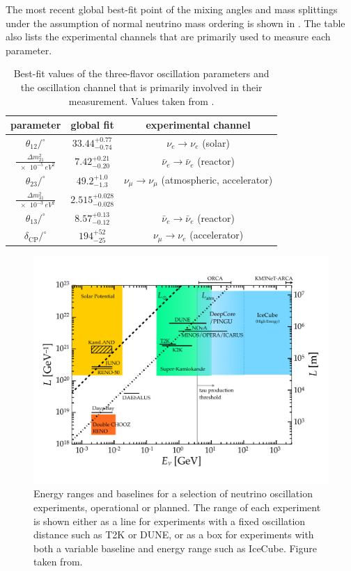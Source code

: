 The most recent global best-fit point\cite{Esteban:2020cvm} of the mixing angles and mass splittings under the assumption of normal neutrino mass ordering is shown in .
The table also lists the experimental channels that are primarily used to measure each parameter.
\begin{table}
\caption{Best-fit values of the three-flavor oscillation parameters and the oscillation channel that is primarily involved in their measurement. Values taken from \cite{Esteban:2020cvm}.\label{tab:global-bfp}}
\begin{tabular}{ccc}\toprule
    parameter & global fit & experimental channel \\ \midrule
    $\theta_{12}/^\circ$                    & $33.44^{+0.77}_{-0.74}$   & $\nu_e \rightarrow \nu_e$ (solar)\\
    $\frac{\Delta m^2_{21}}{\SI{e-5}{eV^2}}$& $7.42^{+0.21}_{-0.20}$    & $\bar{\nu}_e \rightarrow \bar{\nu}_e$ (reactor)\\
    $\theta_{23}/^\circ$                    & $49.2^{+1.0}_{-1.3} $     & $\nu_\mu \rightarrow \nu_\mu$  (atmospheric, accelerator)\\
    $\frac{\Delta m^2_{31}}{\SI{e-3}{eV^2}}$& $2.515^{+0.028}_{-0.028}$ & \\
    $\theta_{13}/^\circ$                    & $8.57^{+0.13}_{-0.12} $   & $\bar{\nu}_e \rightarrow \bar{\nu}_e$ (reactor)\\
    $\delta_\mathrm{CP}/^\circ$             & $194^{+52}_{-25}$         & $\nu_\mu \rightarrow \nu_e$ (accelerator)\\ \bottomrule
\end{tabular}
\end{table}

\begin{figure}
    \centering
    \includegraphics{figures/theory/LvsE.pdf}
    \caption{Energy ranges and baselines for a selection of neutrino oscillation experiments, operational or planned.  The range of each experiment is shown either as a line for experiments with a fixed oscillation distance such as T2K or DUNE, or as a box for experiments with both a variable baseline and energy range such as IceCube. Figure taken from\cite{IceCube:2016xxt}.\label{fig:oscillation-experiments-overview}}
\end{figure}

